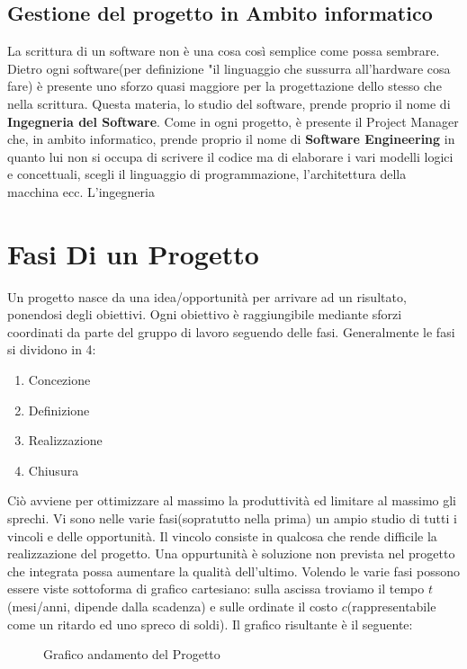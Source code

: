 \documentclass{report}
\begin{document}
\section{Gestione del progetto in Ambito informatico}
La scrittura di un software non è una cosa così semplice come possa sembrare.
Dietro ogni software(per definizione "il linguaggio che sussurra all'hardware cosa fare) è presente uno sforzo quasi maggiore per la progettazione dello stesso che nella scrittura.
Questa materia, lo studio del software, prende proprio il nome di \textbf{Ingegneria del Software}.
Come in ogni progetto, è presente il Project Manager che, in ambito informatico, prende proprio il nome di \textbf{Software Engineering} in quanto lui non si occupa di scrivere il codice ma di elaborare i vari modelli logici e concettuali, scegli  il linguaggio di programmazione, l'architettura della macchina ecc.
L'ingegneria

\chapter{Fasi Di un Progetto}
Un progetto nasce da una idea/opportunità per arrivare ad un risultato, ponendosi degli obiettivi.
Ogni obiettivo è raggiungibile mediante sforzi coordinati da parte del gruppo di lavoro seguendo delle fasi.
Generalmente le fasi si dividono in 4:

\begin{enumerate}
\item Concezione
\item Definizione
\item Realizzazione
\item Chiusura	
\end{enumerate}

Ciò avviene per ottimizzare al massimo la produttività ed limitare al massimo gli sprechi.
Vi sono nelle varie fasi(sopratutto nella prima) un ampio studio di tutti i vincoli e delle opportunità.
Il vincolo consiste in qualcosa che rende difficile la realizzazione del progetto.
Una oppurtunità è soluzione non prevista nel progetto che integrata possa aumentare la qualità dell'ultimo.
Volendo le varie fasi possono essere viste sottoforma di grafico cartesiano:
sulla ascissa troviamo il tempo \(t\)(mesi/anni, dipende dalla scadenza) e sulle ordinate il costo \(c\)(rappresentabile come un ritardo ed uno spreco di soldi).
Il grafico risultante è il seguente:
\begin{figure}[h!]
\caption{Grafico andamento del Progetto}
\label{grap1}
\end{figure}
\end{document}
